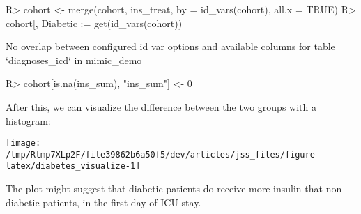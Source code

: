 \documentclass[
]{jss}
\begin{document}
\begin{CodeChunk}
\begin{CodeInput}
R> cohort <- merge(cohort, ins_treat, by = id_vars(cohort), all.x = TRUE)
R> cohort[, Diabetic := get(id_vars(cohort)) %
\end{CodeInput}

\begin{CodeOutput}
No overlap between configured id var options and available columns for table
`diagnoses_icd` in mimic_demo
\end{CodeOutput}

\begin{CodeInput}
R> cohort[is.na(ins_sum), "ins_sum"] <- 0
\end{CodeInput}
\end{CodeChunk}

After this, we can visualize the difference between the two groups with
a histogram:

\begin{CodeChunk}


\begin{center}\texttt{[image: /tmp/Rtmp7XLp2F/file39862b6a50f5/dev/articles/jss\_files/figure-latex/diabetes\_visualize-1]} \end{center}

\end{CodeChunk}

The plot might suggest that diabetic patients do receive more insulin
that non-diabetic patients, in the first day of ICU stay.


\end{document}
